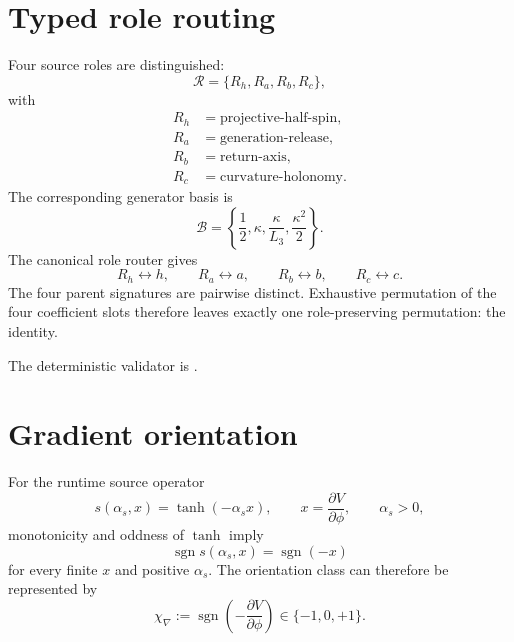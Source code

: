 \section{Typed role routing}
Four source roles are distinguished:
\[
\mathcal R
=\{R_h,R_a,R_b,R_c\},
\]
with
\begin{align}
R_h&=\text{projective-half-spin},\\
R_a&=\text{generation-release},\\
R_b&=\text{return-axis},\\
R_c&=\text{curvature-holonomy}.
\end{align}
The corresponding generator basis is
\begin{equation}
\mathcal B
=\left\{
\frac12,
\kappa,
\frac{\kappa}{L_3},
\frac{\kappa^2}{2}
\right\}.
\label{eq:v12-generator-basis}
\end{equation}
The canonical role router gives
\begin{equation}
\boxed{
R_h\leftrightarrow h,
\qquad
R_a\leftrightarrow a,
\qquad
R_b\leftrightarrow b,
\qquad
R_c\leftrightarrow c.
}
\label{eq:v12-role-slot-map}
\end{equation}
The four parent signatures are pairwise distinct. Exhaustive permutation of the
four coefficient slots therefore leaves exactly one role-preserving
permutation: the identity.

The deterministic validator is
.

\section{Gradient orientation}
For the runtime source operator
\begin{equation}
s(\alpha_s,x)=\tanh(-\alpha_s x),
\qquad
x=\frac{\partial V}{\partial\phi},
\qquad
\alpha_s>0,
\label{eq:v12-gradient-source}
\end{equation}
monotonicity and oddness of $\tanh$ imply
\begin{equation}
\boxed{
\operatorname{sgn}s(\alpha_s,x)
=\operatorname{sgn}(-x)
}
\label{eq:v12-gradient-sign}
\end{equation}
for every finite $x$ and positive $\alpha_s$. The orientation class can
therefore be represented by
\begin{equation}
\boxed{
\chi_{\nabla}
:=\operatorname{sgn}\!\left(-\frac{\partial V}{\partial\phi}\right)
\in\{-1,0,+1\}.
}
\label{eq:v12-gradient-orientation}
\end{equation}

